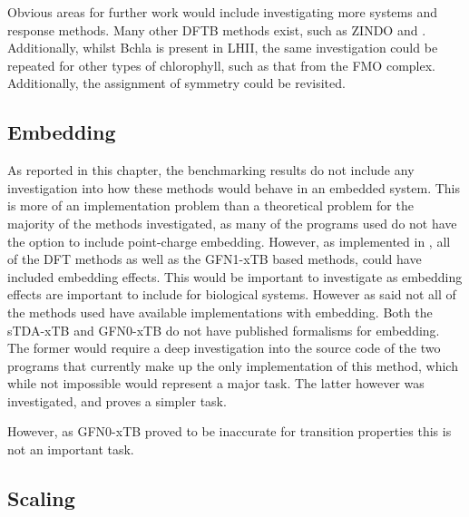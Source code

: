Obvious areas for further work would include investigating more systems and 
response methods. Many other DFTB methods exist, such as ZINDO and . Additionally,
whilst Bchla is present in LHII, the same investigation could be repeated for other
types of chlorophyll, such as that from the FMO complex. Additionally, the assignment
of symmetry could be revisited.

\subsection{Embedding}
\label{subsec:dscf_embedding}

As reported in this chapter, the benchmarking results do not include any investigation
into how these methods would behave in an embedded system. This is more of an 
implementation problem than a theoretical problem for the majority of the methods
investigated, as many of the programs used do not have the option to include
point-charge embedding. However, as implemented in , all of the DFT 
methods as well as the GFN1-xTB based methods, could have included embedding effects.
This would be important to investigate as embedding effects are important to include
for biological systems.
However as said not all of the methods used have available implementations with
embedding. Both the sTDA-xTB and GFN0-xTB do not have published formalisms for
embedding. The former would require a deep investigation into the source code of
the two programs that currently make up the only implementation of this method,
which while not impossible would represent a major task.
The latter however was investigated, and proves a simpler task.

However, as GFN0-xTB proved to be inaccurate for transition properties this is not
an important task.

\subsection{Scaling}
\label{subsec:dscf_scaling}

